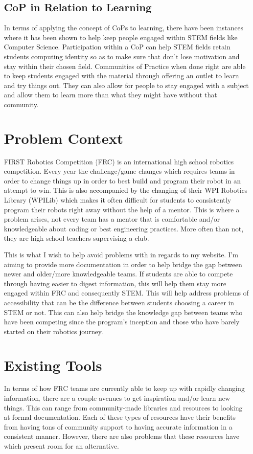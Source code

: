 \documentclass[10pt,twocolumn]{article}
\begin{document}
\subsection{CoP in Relation to Learning}

In terms of applying the concept of CoPs to learning, there have been instances where it has been shown to help keep people engaged within STEM fields like Computer Science. Participation within a CoP can help STEM fields retain students computing identity so as to make sure that don't lose motivation and stay within their chosen field\cite{kargarmoakhar_impact_2024}. Communities of Practice when done right are able to keep students engaged with the material through offering an outlet to learn and try things out. They can also allow for people to stay engaged with a subject and allow them to learn more than what they might have without that community.


\section{Problem Context}
FIRST Robotics Competition (FRC) is an international high school robotics competition. Every year the challenge/game changes which requires teams in order to change things up in order to best build and program their robot in an attempt to win. This is also accompanied by the changing of their WPI Robotics Library (WPILib) which makes it often difficult for students to consistently program their robots right away without the help of a mentor. This is where a problem arises, not every team has a mentor that is comfortable and/or knowledgeable about coding or best engineering practices. More often than not, they are high school teachers supervising a club. 

This is what I wish to help avoid problems with in regards to my website. I'm aiming to provide more documentation in order to help bridge the gap between newer and older/more knowledgeable teams. If students are able to compete through having easier to digest information, this will help them stay more engaged within FRC and consequently STEM. This will help address problems of accessibility that can be the difference between students choosing a career in STEM or not.  This can also help bridge the knowledge gap between teams who have been competing since the program's inception and those who have barely started on their robotics journey.



\section{Existing Tools}
In terms of how FRC teams are currently able to keep up with rapidly changing information, there are a couple avenues to get inspiration and/or learn new things. This can range from community-made libraries and resources to looking at formal documentation. Each of these types of resources have their benefits from having tons of community support to having accurate information in a consistent manner. However, there are also problems that these resources have which present room for an alternative.
\end{document}
